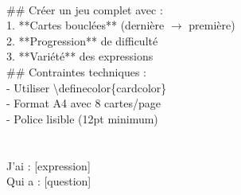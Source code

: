 \begin{Exemple}
\begin{MultiColonnes}{2}
        \tcbitem \ttfamily\small 
        \hspace{1em}\\
        \hspace{2em}\#\# Créer un jeu complet avec :\\
        \hspace{2em}1. **Cartes bouclées** (dernière $\rightarrow$ première)\\
        \hspace{2em}2. **Progression** de difficulté\\
        \hspace{2em}3. **Variété** des expressions\\[0.5em]
        \hspace{2em}\#\# Contraintes techniques :\\
        \hspace{2em}- Utiliser \textbackslash{}definecolor\{cardcolor\}\\
        \hspace{2em}- Format A4 avec 8 cartes/page\\
        \hspace{2em}- Police lisible (12pt minimum)\\
        \hspace{1em}\\[0.5em]
        \hspace{1em}\\
        \hspace{2em}J'ai : [expression]\\
        \hspace{2em}Qui a : [question]\\
        \hspace{1em}
    \end{MultiColonnes}
\end{Exemple}
